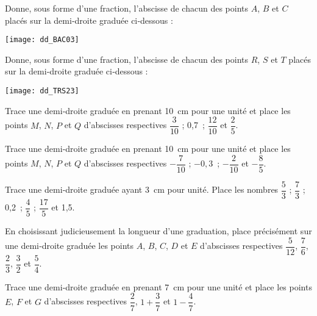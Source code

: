 

\begin{exercice}
Donne, sous forme d'une fraction, l'abscisse de chacun des points $A$, $B$ et $C$ placés sur la demi‑droite graduée ci‑dessous :
\begin{center} \texttt{[image: dd\_BAC03]} \end{center}
Donne, sous forme d'une fraction, l'abscisse de chacun des points $R$, $S$ et $T$ placés sur la demi‑droite graduée ci‑dessous :
\begin{center} \texttt{[image: dd\_TRS23]} \end{center}
\end{exercice}


\begin{exercice}
Trace une demi‑droite graduée en prenant 10 cm pour une unité et place les points $M$, $N$, $P$ et $Q$ d'abscisses respectives $\dfrac{3}{10}$ ; 0,7 ; $\dfrac{12}{10}$ et $\dfrac{2}{5}$.
\end{exercice}


\begin{exercice}
Trace une demi‑droite graduée en prenant 10 cm pour une unité et place les points $M$, $N$, $P$ et $Q$ d'abscisses respectives $- \dfrac{7}{10}$ ; $- 0,3$ ; $- \dfrac{2}{10}$ et $- \dfrac{8}{5}$.
\end{exercice}


\begin{exercice}
Trace une demi‑droite graduée ayant 3 cm pour unité. Place les nombres $\dfrac{5}{3}$ ; $\dfrac{7}{3}$ ; 0,2 ; $\dfrac{4}{5}$ ; $\dfrac{17}{5}$ et 1,5.
\end{exercice}


\begin{exercice}
En choisissant judicieusement la longueur d'une graduation, place précisément sur une demi‑droite graduée les points $A$, $B$, $C$, $D$ et $E$ d'abscisses respectives $\dfrac{5}{12}$, $\dfrac{7}{6}$, $\dfrac{2}{3}$, $\dfrac{3}{2}$ et $\dfrac{5}{4}$.
\end{exercice}


\begin{exercice}
Trace une demi‑droite graduée en prenant 7 cm pour une unité et place les points $E$, $F$ et $G$ d'abscisses respectives $\dfrac{2}{7}$, $1 + \dfrac{3}{7}$ et $1 - \dfrac{4}{7}$.
\end{exercice}


